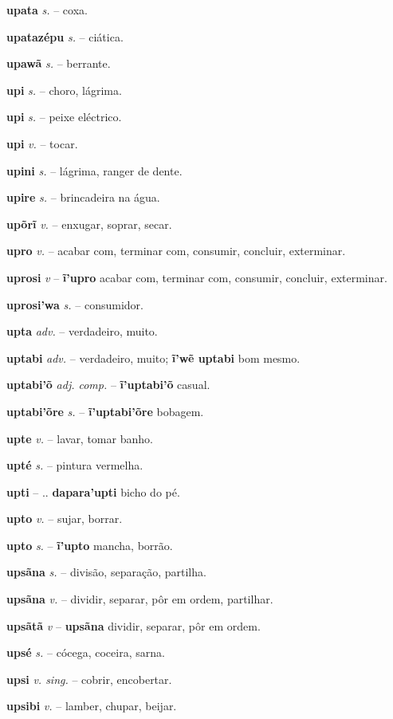\textbf{upata} \textit{s.} -- coxa.

\textbf{upatazépu} \textit{s.} -- ciática.

\textbf{upawã} \textit{s.} -- berrante.

\textbf{upi} \textit{s.} -- choro, lágrima.

\textbf{upi} \textit{s.} -- peixe eléctrico.

\textbf{upi} \textit{v.} -- tocar.

\textbf{upini} \textit{s.} -- lágrima, ranger de dente.

\textbf{upire} \textit{s.} -- brincadeira na água.

\textbf{upõrĩ} \textit{v.} -- enxugar, soprar, secar.

\textbf{upro} \textit{v.} -- acabar com, terminar com, consumir, concluir, exterminar.

\textbf{uprosi} \textit{v} -- \textbf{ĩ'upro} acabar com, terminar com, consumir, concluir, exterminar.

\textbf{uprosi'wa} \textit{s.} -- consumidor.

\textbf{upta} \textit{adv.} -- verdadeiro, muito.

\textbf{uptabi} \textit{adv.} -- verdadeiro, muito; \textbf{ĩ'wẽ uptabi} bom mesmo.

\textbf{uptabi'õ} \textit{adj. comp.} -- \textbf{ĩ'uptabi'õ} casual.

\textbf{uptabi'õre} \textit{s.} -- \textbf{ĩ'uptabi'õre} bobagem.

\textbf{upte} \textit{v.} -- lavar, tomar banho.

\textbf{upté} \textit{s.} -- pintura vermelha.

\textbf{upti} \textit{} -- .. \textbf{dapara'upti} bicho do pé.

\textbf{upto} \textit{v.} -- sujar, borrar.

\textbf{upto} \textit{s.} -- \textbf{ĩ'upto} mancha, borrão.

\textbf{upsãna} \textit{s.} -- divisão, separação, partilha.

\textbf{upsãna} \textit{v.} -- dividir, separar, pôr em ordem, partilhar.

\textbf{upsãtã} \textit{v} -- \textbf{upsãna} dividir, separar, pôr em ordem.

\textbf{upsé} \textit{s.} -- cócega, coceira, sarna.

\textbf{upsi} \textit{v. sing.} -- cobrir, encobertar.

\textbf{upsibi} \textit{v.} -- lamber, chupar, beijar.

